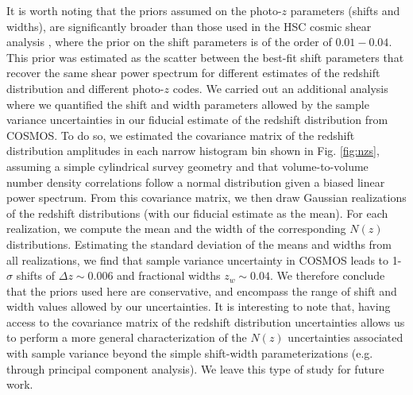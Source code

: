 \documentclass[a4paper,11pt]{article}
\begin{document}
    It is worth noting that the priors assumed on the photo-$z$ parameters (shifts and widths), are significantly broader than those used in the HSC cosmic shear analysis \cite{2019PASJ...71...43H}, where the prior on the shift parameters is of the order of $0.01-0.04$. This prior was estimated as the scatter between the best-fit shift parameters that recover the same shear power spectrum for different estimates of the redshift distribution and different photo-$z$ codes. We carried out an additional analysis where we quantified the shift and width parameters allowed by the sample variance uncertainties in our fiducial estimate of the redshift distribution from COSMOS. To do so, we estimated the covariance matrix of the redshift distribution amplitudes in each narrow histogram bin shown in Fig. \ref{fig:nzs}, assuming a simple cylindrical survey geometry and that volume-to-volume number density correlations follow a normal distribution given a biased linear power spectrum. From this covariance matrix, we then draw Gaussian realizations of the redshift distributions (with our fiducial estimate as the mean). For each realization, we compute the mean and the width of the corresponding $N(z)$ distributions. Estimating the standard deviation of the means and widths from all realizations, we find that sample variance uncertainty in COSMOS leads to 1-$\sigma$ shifts of $\Delta z\sim0.006$ and fractional widths $z_w\sim 0.04$. We therefore conclude that the priors used here are conservative, and encompass the range of shift and width values allowed by our uncertainties. It is interesting to note that, having access to the covariance matrix of the redshift distribution uncertainties  allows us to perform a more general characterization of the $N(z)$ uncertainties associated with sample variance beyond the simple shift-width parameterizations (e.g. through principal component analysis). We leave this type of study for future work.
\end{document}
